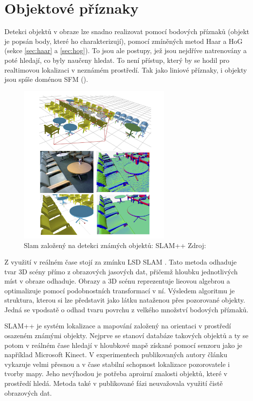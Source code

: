 	

\section{Objektové příznaky}
\label{sec:obj}
	Detekci objektů v obraze lze snadno realizovat pomocí bodových příznaků (objekt je popsán body, které ho charakterizují), pomocí zmíněných metod Haar a HoG (sekce \ref{sec:haar} a \ref{sec:hog}). To jsou ale postupy, jež jsou nejdříve natrenovány a poté hledají, co byly naučeny hledat. To není přístup, který by se hodil pro realtimovou lokalizaci v neznámém prostředí. Tak jako liniové příznaky, i objekty jsou spíše doménou SFM (\cite{bao2011semantic}). 
	
	\begin{figure}[!ht] 
		\centering
		\includegraphics[width=3in]{img/SLAMpp.png}
		\caption{Slam založený na detekci známých objektů: SLAM++ Zdroj: \cite{salas2013slam++}
		}	
		\label{slampp}
	\end{figure} 
	
	Z využití v reálném čase stojí za zmínku LSD SLAM \cite{engel2014lsd}. Tato metoda odhaduje tvar 3D scény přímo z obrazových jasových dat, přičemž hloubku jednotlivých míst v obraze odhaduje. Obrazy a 3D scénu reprezentuje lieovou algebrou a optimalizuje pomocí podobnostních transformací v ní. Výsledem algoritmu je struktura, kterou si lze představit jako látku nataženou přes pozorované objekty. Jedná se vpodsatě o odhad tvaru povrchu z velkého množství bodových příznaků.
	
	SLAM++ \cite{salas2013slam++} je systém lokalizace a mapování založený na orientaci v prostředí osazeném známými objekty. Nejprve se stanoví databáze takových objektů a ty se potom v reálném čase hledají v hloubkové mapě získané pomocí senzoru jako je například Microsoft Kinect. V experimentech publikovaných autory článku vykazuje velmi přesnou a v čase stabilní schopnost lokalizace pozorovatele i tvorby mapy. Jeho nevýhodou je potřeba aproirní znalosti objektů, které v prostředí hledá. Metoda také v publikované fázi neuvažovala využití čistě obrazových dat.



